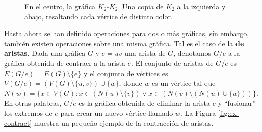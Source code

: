 \begin{figure}[ht!]
    \centering
        \caption{En el centro, la gr\'afica $K_2 \square K_2$. Una copia de
        $K_2$ a la izquierda y abajo, resaltando cada v\'ertice de distinto
        color.}
        \label{fig:ex-cartesiano}
    \end{figure}

Hasta ahora se han definido operaciones para dos o m\'as gr\'aficas, sin
embargo, tambi\'en existen operaciones sobre una misma gr\'afica. Tal es el caso
de la  \textbf{de aristas}. Dada una gr\'afica
$G$ y $e=uv$ una arista de $G$, denotamos $G/e$ a la gr\'afica obtenida de
contraer a la arista $e$. El conjunto de aristas de $G/e$ es $ E(G/e)=E(G)
\setminus \{e\}$ y el conjunto de v\'ertices es $V(G/e)=(V(G)\setminus \{u,v\})
\cup \{w\}$, donde $w$ es un v\'ertice tal que $N(w)=\{x \in V(G) \colon x \in
(N(u)\setminus \{v\}) \lor x \in (N(v) \setminus (N(u) \cup \{u\}))\}$. En otras
palabras, $G/e$ es la gr\'afica obtenida de eliminar la arista $e$ y
``fusionar'' los extremos de $e$ para crear un nuevo v\'ertice llamado $w$. La
Figura \ref{fig:ex-contract} muestra un peque\~{n}o ejemplo de la contracci\'on
de aristas.


